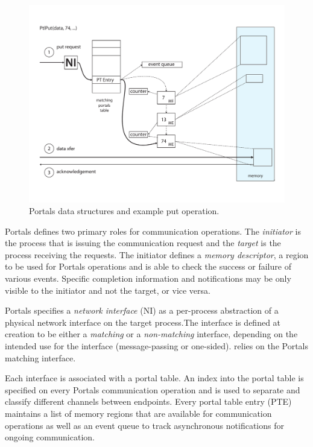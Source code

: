 \begin{figure}[ht]
  \centering
  \includegraphics[width=\linewidth]{figs/portals_put}
  \caption{Portals data structures and example put operation.}
  \label{fig:portals_put}
\end{figure}

Portals defines two primary roles for communication operations. The
{\em initiator} is the process that is issuing the communication
request and the {\em target} is the process receiving the
requests. The initiator defines a {\em memory descriptor}, a
region to be used for Portals operations and is able to check the
success or failure of various events. Specific completion information
and notifications may be only visible to the initiator and not the
target, or vice versa.

Portals specifies a {\em network interface} (NI) as a per-process
abstraction of a physical network interface on the target process.The
interface is defined at creation to be either a {\em matching}
or a {\em non-matching} interface, depending on the intended use for
the interface (message-passing or one-sided). \pdht relies on the
Portals matching interface.

Each interface is associated with a portal table. An index into the
portal table is specified on every Portals communication operation and
is used to separate and classify different channels between endpoints.
Every portal table entry (PTE) maintains a list of memory regions that
are available for communication operations as well as an event queue
to track asynchronous notifications for ongoing communication.

